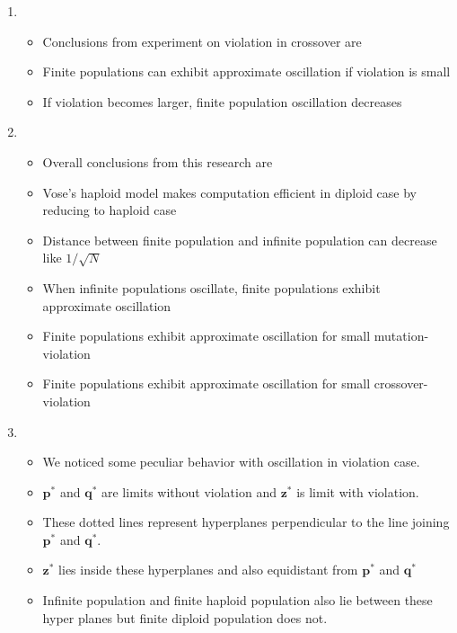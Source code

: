 \documentclass{article}
\begin{document}
\begin{enumerate}
\begin{itemize}
  \end{itemize}  

  
\item
  \begin{itemize}
  \item Conclusions from experiment on violation in crossover are 
  \item Finite populations can exhibit approximate oscillation if violation is small
  \item If violation becomes larger, finite population oscillation decreases
  \end{itemize}
  
\item
  \begin{itemize}
  \item Overall conclusions from this research are
  \item Vose's haploid model makes computation efficient in diploid case by reducing to haploid case 
  \item Distance between finite population and infinite population can decrease like $1/\sqrt{N}$
  \item When infinite populations oscillate, finite populations exhibit approximate oscillation
  \item Finite populations exhibit approximate oscillation for small mutation-violation
  \item Finite populations exhibit approximate oscillation for small crossover-violation        
  \end{itemize}
  
\item
  \begin{itemize}
    \item We noticed some peculiar behavior with oscillation in violation case. 
    
    \item $\bm{p}^\ast$ and $\bm{q}^\ast$ are limits without violation and $\bm{z}^\ast$ is limit with violation.
    
    \item These dotted lines represent hyperplanes perpendicular to the line joining $\bm{p}^\ast$ and $\bm{q}^\ast$. 
    
    \item  $\bm{z}^\ast$ lies inside these hyperplanes and also equidistant from $\bm{p}^\ast$ and $\bm{q}^\ast$
    
    \item  Infinite population and finite haploid population also lie between these hyper planes but finite diploid population does not.
  \end{itemize}
  

\end{enumerate}
\end{document}
